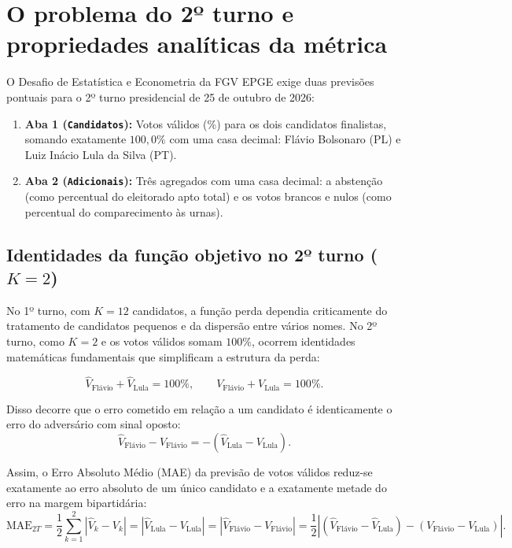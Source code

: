\documentclass[10.5pt,a4paper]{article}
\begin{document}
\section{O problema do 2º turno e propriedades analíticas da métrica}

O Desafio de Estatística e Econometria da FGV EPGE exige duas previsões pontuais para o 2º turno presidencial de 25 de outubro de 2026:
\begin{enumerate}
    \item \textbf{Aba 1 (\texttt{Candidatos}):} Votos válidos (\%) para os dois candidatos finalistas, somando exatamente $100{,}0\%$ com uma casa decimal: Flávio Bolsonaro (PL) e Luiz Inácio Lula da Silva (PT).
    \item \textbf{Aba 2 (\texttt{Adicionais}):} Três agregados com uma casa decimal: a abstenção (como percentual do eleitorado apto total) e os votos brancos e nulos (como percentual do comparecimento às urnas).
\end{enumerate}

\subsection{Identidades da função objetivo no 2º turno \texorpdfstring{($K = 2$)}{(K = 2)}}

No 1º turno, com $K=12$ candidatos, a função perda dependia criticamente do tratamento de candidatos pequenos e da dispersão entre vários nomes. No 2º turno, como $K=2$ e os votos válidos somam $100\%$, ocorrem identidades matemáticas fundamentais que simplificam a estrutura da perda:

\begin{equation}
\hat{V}_{\text{Flávio}} + \hat{V}_{\text{Lula}} = 100\%, \qquad V_{\text{Flávio}} + V_{\text{Lula}} = 100\%.
\end{equation}

Disso decorre que o erro cometido em relação a um candidato é identicamente o erro do adversário com sinal oposto:
\begin{equation}
\hat{V}_{\text{Flávio}} - V_{\text{Flávio}} = - (\hat{V}_{\text{Lula}} - V_{\text{Lula}}).
\end{equation}

Assim, o Erro Absoluto Médio (MAE) da previsão de votos válidos reduz-se exatamente ao erro absoluto de um único candidato e a exatamente metade do erro na margem bipartidária:
\begin{equation}
\text{MAE}_{2T} = \frac{1}{2} \sum_{k=1}^{2} |\hat{V}_k - V_k| = |\hat{V}_{\text{Lula}} - V_{\text{Lula}}| = |\hat{V}_{\text{Flávio}} - V_{\text{Flávio}}| = \frac{1}{2} \left| (\hat{V}_{\text{Flávio}} - \hat{V}_{\text{Lula}}) - (V_{\text{Flávio}} - V_{\text{Lula}}) \right|.
\label{eq:mae_identidade}
\end{equation}
\end{document}
